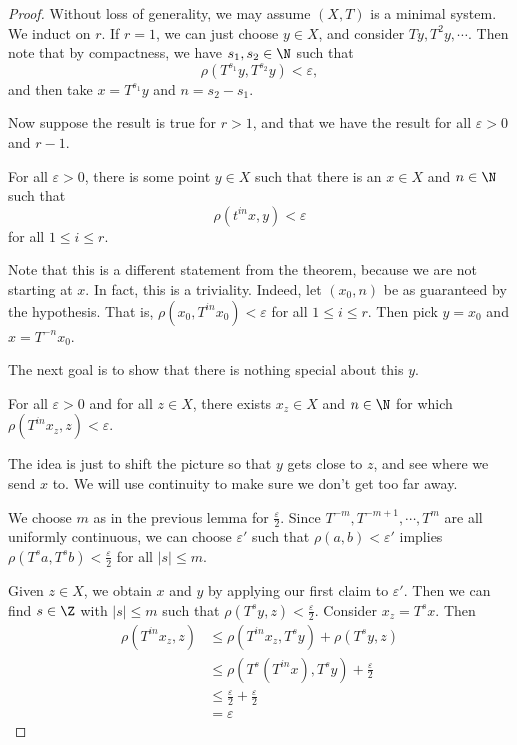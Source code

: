 \documentclass[a4paper]{article}
\begin{document}
\begin{proof}
  Without loss of generality, we may assume $(X, T)$ is a minimal system. We induct on $r$. If $r = 1$, we can just choose $y \in X$, and consider $T y, T^2 y, \cdots$. Then note that by compactness, we have $s_1, s_2 \in \N$ such that
  \[
    \rho(T^{s_1} y,T^{s_2} y) < \varepsilon,
  \]
  and then take $x = T^{s_1} y$ and $n = s_2 - s_1$.

  Now suppose the result is true for $r > 1$, and that we have the result for all $\varepsilon > 0$ and $r - 1$.
  \begin{claim}
    For all $\varepsilon > 0$, there is some point $y \in X$ such that there is an $x \in X$ and $n \in \N$ such that
    \[
      \rho(t^{in} x, y) < \varepsilon
    \]
    for all $1 \leq i \leq r$.
  \end{claim}
  Note that this is a different statement from the theorem, because we are not starting at $x$. In fact, this is a triviality. Indeed, let $(x_0, n)$ be as guaranteed by the hypothesis. That is, $\rho(x_0, T^{in}x_0) < \varepsilon$ for all $1 \leq i \leq r$. Then pick $y = x_0$ and $x = T^{-n}x_0$.

  The next goal is to show that there is nothing special about this $y$.
  \begin{claim}
    For all $\varepsilon > 0$ and for all $z \in X$, there exists $x_z \in X$ and $n \in \N$ for which $\rho(T^{in} x_z, z) < \varepsilon$.
  \end{claim}
  The idea is just to shift the picture so that $y$ gets close to $z$, and see where we send $x$ to. We will use continuity to make sure we don't get too far away.

  We choose $m$ as in the previous lemma for $\frac{\varepsilon}{2}$. Since $T^{-m}, T^{-m + 1}, \cdots, T^m$ are all uniformly continuous, we can choose $\varepsilon'$ such that $\rho(a, b) < \varepsilon'$ implies $\rho(T^s a, T^s b) < \frac{\varepsilon}{2}$ for all $|s| \leq m$.

  Given $z \in X$, we obtain $x$ and $y$ by applying our first claim to $\varepsilon'$. Then we can find $s \in \Z$ with $|s| \leq m$ such that $\rho(T^s y, z) < \frac{\varepsilon}{2}$. Consider $x_z = T^s x$. Then
  \begin{align*}
    \rho(T^{in} x_z, z) &\leq \rho(T^{in} x_z, T^s y) + \rho(T^s y, z) \\
    &\leq \rho(T^s(T^{in}x), T^s y) + \frac{\varepsilon}{2}\\
    &\leq \frac{\varepsilon}{2} + \frac{\varepsilon}{2}\\
    &= \varepsilon
  \end{align*}


\end{proof}
\end{document}
